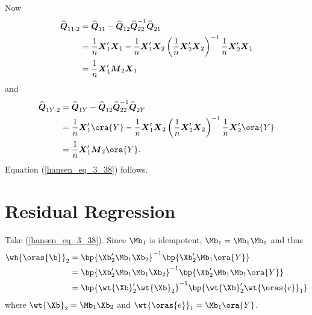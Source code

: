 Now
\begin{equation}
    \notag
    \begin{aligned}
        \widehat{\boldsymbol{Q}}_{11 \cdot 2} & =\widehat{\boldsymbol{Q}}_{11}-\widehat{\boldsymbol{Q}}_{12} \widehat{\boldsymbol{Q}}_{22}^{-1} \widehat{\boldsymbol{Q}}_{21} \\
        & =\frac{1}{n} \boldsymbol{X}_1^{\prime} \boldsymbol{X}_1-\frac{1}{n} \boldsymbol{X}_1^{\prime} \boldsymbol{X}_2\left(\frac{1}{n} \boldsymbol{X}_2^{\prime} \boldsymbol{X}_2\right)^{-1} \frac{1}{n} \boldsymbol{X}_2^{\prime} \boldsymbol{X}_1 \\
        & =\frac{1}{n} \boldsymbol{X}_1^{\prime} \boldsymbol{M}_2 \boldsymbol{X}_1
    \end{aligned}
\end{equation}
and 
\begin{equation}
    \notag
    \begin{aligned}
        \widehat{\boldsymbol{Q}}_{1 Y \cdot 2} & =\widehat{\boldsymbol{Q}}_{1 Y}-\widehat{\boldsymbol{Q}}_{12} \widehat{\boldsymbol{Q}}_{22}^{-1} \widehat{\boldsymbol{Q}}_{2 Y} \\
        & =\frac{1}{n} \boldsymbol{X}_1^{\prime} \ora{Y}-\frac{1}{n} \boldsymbol{X}_1^{\prime} \boldsymbol{X}_2\left(\frac{1}{n} \boldsymbol{X}_2^{\prime} \boldsymbol{X}_2\right)^{-1} \frac{1}{n} \boldsymbol{X}_2^{\prime} \ora{Y} \\
        & =\frac{1}{n} \boldsymbol{X}_1^{\prime} \boldsymbol{M}_2 \ora{Y} .
    \end{aligned}
\end{equation}
Equation (\ref{hansen_eq_3_38}) follows.


\section{Residual Regression}

Take (\ref{hansen_eq_3_38}). Since $\Mb_1$ is idempotent, $\Mb_1 = \Mb_1 \Mb_1$ and thus 
\begin{equation}
    \notag
    \begin{aligned}
        \wh{\oras{\b}}_2 & = \bp{\Xb_2^\prime \Mb_1 \Xb_2}^{-1}  \bp{\Xb_2^\prime \Mb_1 \ora{Y}} \\
        & = \bp{\Xb_2^\prime \Mb_1 \Mb_1 \Xb_2}^{-1}  \bp{\Xb_2^\prime \Mb_1 \Mb_1 \ora{Y}} \\
        & = \bp{\wt{\Xb}_2^\prime \wt{\Xb}_2}^{-1} \bp{\wt{\Xb}_2^\prime \wt{\oras{e}}_1}
    \end{aligned}
\end{equation}
where $\wt{\Xb}_2 = \Mb_1 \Xb_2$ and $\wt{\oras{e}}_1 = \Mb_1 \ora{Y}$.

